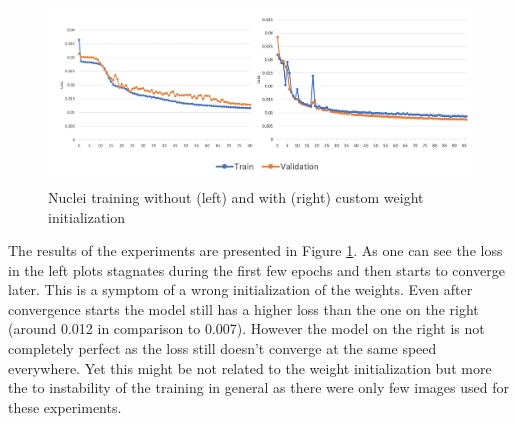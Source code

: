 \begin{figure}[H]
	\begin{center}
		\includegraphics[width=0.8\linewidth]{bilder/nuclei/wi-no-wi.png}
		\caption{Nuclei training without (left) and with (right) custom weight initialization}\label{fig:wi}
	\end{center}
\end{figure}

The results of the experiments are presented in Figure \ref{fig:wi}. As one can see the loss in the left plots stagnates during the first few epochs and then starts to converge later. This is a symptom of a wrong initialization of the weights. Even after convergence starts the model still has a higher loss than the one on the right (around 0.012 in comparison to 0.007). However the model on the right is not completely perfect as the loss still doesn't converge at the same speed everywhere. Yet this might be not related to the weight initialization but more the to instability of the training in general as there were only few images used for these experiments.